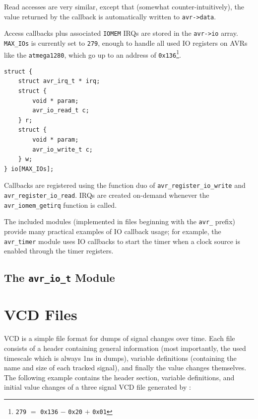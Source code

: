 Read accesses are very similar, except that (somewhat counter-intuitively), the value returned
by the callback is automatically written to \lstinline|avr->data|.

Access callbacks plus associated \lstinline|IOMEM| \acp{IRQ} are stored
in the \lstinline|avr->io| array. \lstinline|MAX_IOs| is currently set to
\lstinline|279|, enough to handle all used \ac{IO} registers on \acp{AVR} like
the \verb|atmega1280|, which go up to an address of \lstinline|0x136|\footnote{
\lstinline|279| $=$ \lstinline|0x136| $-$ \lstinline|0x20| $+$ \lstinline|0x01|}.

\begin{lstlisting}
struct {
    struct avr_irq_t * irq;
    struct {
        void * param;
        avr_io_read_t c;
    } r;
    struct {
        void * param;
        avr_io_write_t c;
    } w;
} io[MAX_IOs];
\end{lstlisting}

Callbacks are registered using the function duo of \lstinline|avr_register_io_write|
and \lstinline|avr_register_io_read|. \acp{IRQ} are created on-demand whenever
the \lstinline|avr_iomem_getirq| function is called.

The included \simavr modules (implemented in files beginning with the \verb|avr_| prefix)
provide many practical examples of \ac{IO} callback usage; for example,
the \verb|avr_timer| module uses \ac{IO} callbacks to start the timer when
a clock source is enabled through the timer registers.

\subsection{The \lstinline|avr_io_t| Module}



\section{\acf{VCD} Files}

\ac{VCD} is a simple file format for dumps of signal changes over time. Each file
consists of a header containing general information (most importantly, the
used timescale which is always 1ns in \simavr dumps), variable definitions
(containing the name and size of each tracked signal), and finally the value
changes themselves. The following example contains the header section, variable
definitions, and initial value changes of a three signal \ac{VCD} file generated
by \simavr:

